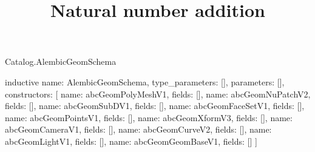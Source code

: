 \begin{lexlean}{Catalog.AlembicGeomSchema}
\title{Natural number addition}
\begin{semanticmodule}
inductive{
  name: AlembicGeomSchema,
  type_parameters: [],
  parameters: [],
  constructors: [
    {name: abcGeomPolyMeshV1, fields: []},
    {name: abcGeomNuPatchV2, fields: []},
    {name: abcGeomSubDV1, fields: []},
    {name: abcGeomFaceSetV1, fields: []},
    {name: abcGeomPointsV1, fields: []},
    {name: abcGeomXformV3, fields: []},
    {name: abcGeomCameraV1, fields: []},
    {name: abcGeomCurveV2, fields: []},
    {name: abcGeomLightV1, fields: []},
    {name: abcGeomGeomBaseV1, fields: []}
  ]
}
\end{semanticmodule}
\end{lexlean}
